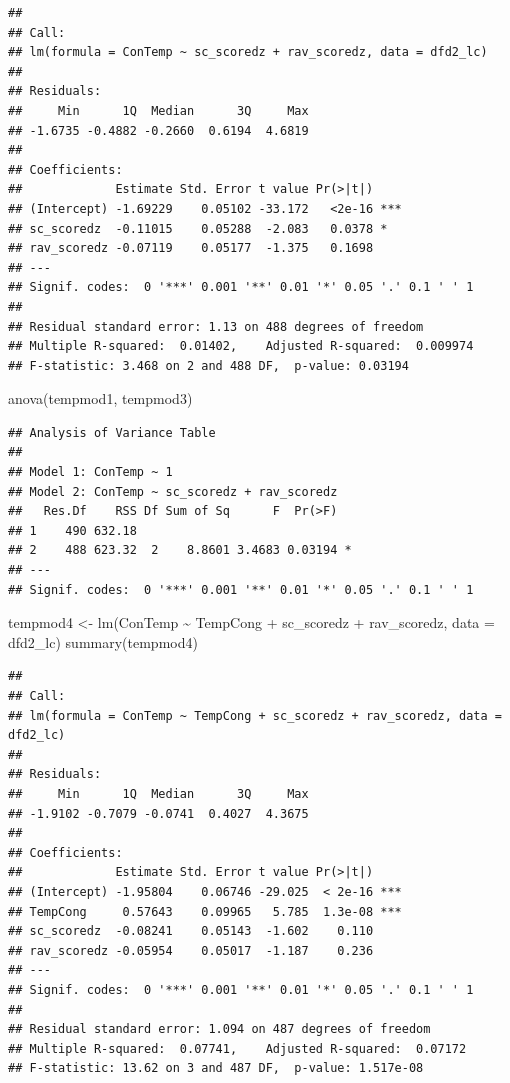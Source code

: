 \documentclass[
]{article}
\newenvironment{Shaded}{\begin{snugshade}}{\end{snugshade}}
\newcommand{\AttributeTok}[1]{\textcolor[rgb]{0.77,0.63,0.00}{#1}}
\newcommand{\FunctionTok}[1]{\textcolor[rgb]{0.00,0.00,0.00}{#1}}
\newcommand{\NormalTok}[1]{#1}
\newcommand{\OtherTok}[1]{\textcolor[rgb]{0.56,0.35,0.01}{#1}}
\newcommand{\SpecialCharTok}[1]{\textcolor[rgb]{0.00,0.00,0.00}{#1}}
\begin{document}
\begin{verbatim}
## 
## Call:
## lm(formula = ConTemp ~ sc_scoredz + rav_scoredz, data = dfd2_lc)
## 
## Residuals:
##     Min      1Q  Median      3Q     Max 
## -1.6735 -0.4882 -0.2660  0.6194  4.6819 
## 
## Coefficients:
##             Estimate Std. Error t value Pr(>|t|)    
## (Intercept) -1.69229    0.05102 -33.172   <2e-16 ***
## sc_scoredz  -0.11015    0.05288  -2.083   0.0378 *  
## rav_scoredz -0.07119    0.05177  -1.375   0.1698    
## ---
## Signif. codes:  0 '***' 0.001 '**' 0.01 '*' 0.05 '.' 0.1 ' ' 1
## 
## Residual standard error: 1.13 on 488 degrees of freedom
## Multiple R-squared:  0.01402,    Adjusted R-squared:  0.009974 
## F-statistic: 3.468 on 2 and 488 DF,  p-value: 0.03194
\end{verbatim}

\begin{Shaded}
\begin{Highlighting}[]
\FunctionTok{anova}\NormalTok{(tempmod1, tempmod3)}
\end{Highlighting}
\end{Shaded}

\begin{verbatim}
## Analysis of Variance Table
## 
## Model 1: ConTemp ~ 1
## Model 2: ConTemp ~ sc_scoredz + rav_scoredz
##   Res.Df    RSS Df Sum of Sq      F  Pr(>F)  
## 1    490 632.18                              
## 2    488 623.32  2    8.8601 3.4683 0.03194 *
## ---
## Signif. codes:  0 '***' 0.001 '**' 0.01 '*' 0.05 '.' 0.1 ' ' 1
\end{verbatim}

\begin{Shaded}
\begin{Highlighting}[]
\NormalTok{tempmod4 }\OtherTok{\textless{}{-}} \FunctionTok{lm}\NormalTok{(ConTemp }\SpecialCharTok{\textasciitilde{}}\NormalTok{ TempCong }\SpecialCharTok{+}\NormalTok{ sc\_scoredz }\SpecialCharTok{+}\NormalTok{ rav\_scoredz, }\AttributeTok{data =}\NormalTok{ dfd2\_lc)}
\FunctionTok{summary}\NormalTok{(tempmod4)}
\end{Highlighting}
\end{Shaded}

\begin{verbatim}
## 
## Call:
## lm(formula = ConTemp ~ TempCong + sc_scoredz + rav_scoredz, data = dfd2_lc)
## 
## Residuals:
##     Min      1Q  Median      3Q     Max 
## -1.9102 -0.7079 -0.0741  0.4027  4.3675 
## 
## Coefficients:
##             Estimate Std. Error t value Pr(>|t|)    
## (Intercept) -1.95804    0.06746 -29.025  < 2e-16 ***
## TempCong     0.57643    0.09965   5.785  1.3e-08 ***
## sc_scoredz  -0.08241    0.05143  -1.602    0.110    
## rav_scoredz -0.05954    0.05017  -1.187    0.236    
## ---
## Signif. codes:  0 '***' 0.001 '**' 0.01 '*' 0.05 '.' 0.1 ' ' 1
## 
## Residual standard error: 1.094 on 487 degrees of freedom
## Multiple R-squared:  0.07741,    Adjusted R-squared:  0.07172 
## F-statistic: 13.62 on 3 and 487 DF,  p-value: 1.517e-08
\end{verbatim}
\end{document}
